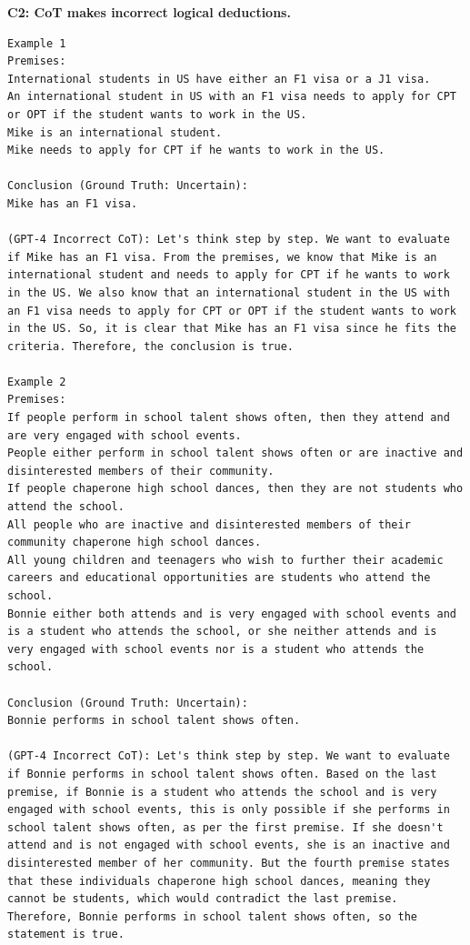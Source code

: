 \textbf{C2: CoT makes incorrect logical deductions.}
\begin{lstlisting}[breaklines=true]
Example 1
Premises:
International students in US have either an F1 visa or a J1 visa.
An international student in US with an F1 visa needs to apply for CPT or OPT if the student wants to work in the US.
Mike is an international student.
Mike needs to apply for CPT if he wants to work in the US.

Conclusion (Ground Truth: Uncertain):
Mike has an F1 visa.

(GPT-4 Incorrect CoT): Let's think step by step. We want to evaluate if Mike has an F1 visa. From the premises, we know that Mike is an international student and needs to apply for CPT if he wants to work in the US. We also know that an international student in the US with an F1 visa needs to apply for CPT or OPT if the student wants to work in the US. So, it is clear that Mike has an F1 visa since he fits the criteria. Therefore, the conclusion is true.

Example 2
Premises:
If people perform in school talent shows often, then they attend and are very engaged with school events.
People either perform in school talent shows often or are inactive and disinterested members of their community.
If people chaperone high school dances, then they are not students who attend the school.
All people who are inactive and disinterested members of their community chaperone high school dances.
All young children and teenagers who wish to further their academic careers and educational opportunities are students who attend the school.
Bonnie either both attends and is very engaged with school events and is a student who attends the school, or she neither attends and is very engaged with school events nor is a student who attends the school.

Conclusion (Ground Truth: Uncertain):
Bonnie performs in school talent shows often.

(GPT-4 Incorrect CoT): Let's think step by step. We want to evaluate if Bonnie performs in school talent shows often. Based on the last premise, if Bonnie is a student who attends the school and is very engaged with school events, this is only possible if she performs in school talent shows often, as per the first premise. If she doesn't attend and is not engaged with school events, she is an inactive and disinterested member of her community. But the fourth premise states that these individuals chaperone high school dances, meaning they cannot be students, which would contradict the last premise. Therefore, Bonnie performs in school talent shows often, so the statement is true.
\end{lstlisting}

